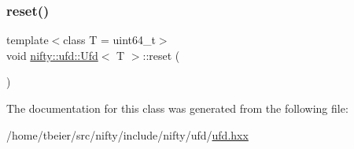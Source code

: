 \subsubsection{\texorpdfstring{reset()}{reset()}}
{\footnotesize\ttfamily template$<$class T = uint64\+\_\+t$>$ \\
void \hyperlink{classnifty_1_1ufd_1_1Ufd}{nifty\+::ufd\+::\+Ufd}$<$ T $>$\+::reset (\begin{DoxyParamCaption}{ }\end{DoxyParamCaption})\hspace{0.3cm}{\ttfamily [inline]}}



The documentation for this class was generated from the following file\+:\begin{DoxyCompactItemize}
\item 
/home/tbeier/src/nifty/include/nifty/ufd/\hyperlink{ufd_8hxx}{ufd.\+hxx}\end{DoxyCompactItemize}
